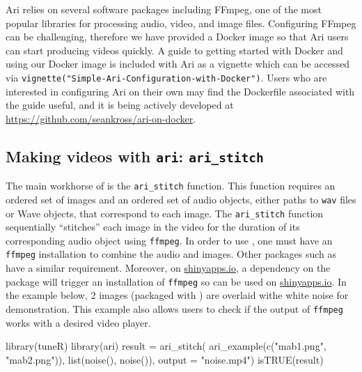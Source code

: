 Ari relies on several software packages including FFmpeg, one of the
most popular libraries for processing audio, video, and image files.
Configuring FFmpeg can be challenging, therefore we have provided a
Docker image so that Ari users can start producing videos quickly. A
guide to getting started with Docker and using our Docker image is
included with Ari as a vignette which can be accessed via
\texttt{vignette("Simple-Ari-Configuration-with-Docker")}. Users who are
interested in configuring Ari on their own may find the Dockerfile
associated with the guide useful, and it is being actively developed at
\url{https://github.com/seankross/ari-on-docker}.

\hypertarget{making-videos-with-ari-ari_stitch}{%
\subsection{\texorpdfstring{Making videos with \texttt{ari}:
\texttt{ari\_stitch}}{Making videos with ari: ari\_stitch}}\label{making-videos-with-ari-ari_stitch}}

The main workhorse of  is the \texttt{ari\_stitch} function.
This function requires an ordered set of images and an ordered set of
audio objects, either paths to \texttt{wav} files or  Wave
objects, that correspond to each image. The \texttt{ari\_stitch}
function sequentially ``stitches'' each image in the video for the
duration of its corresponding audio object using \texttt{ffmpeg}. In
order to use , one must have an \texttt{ffmpeg} installation to
combine the audio and images. Other packages such as 
have a similar requirement. Moreover, on
\href{https://www.shinyapps.io/}{shinyapps.io}, a dependency on the
 package will trigger an installation of \texttt{ffmpeg}
so  can be used on
\href{https://www.shinyapps.io/}{shinyapps.io}. In the example below, 2
images (packaged with ) are overlaid withe white noise for
demonstration. This example also allows users to check if the output of
\texttt{ffmpeg} works with a desired video player.

\begin{Schunk}
\begin{Sinput}
library(tuneR)
library(ari)
result = ari_stitch(
  ari_example(c("mab1.png", "mab2.png")),
  list(noise(), noise()),
  output = "noise.mp4")
isTRUE(result)
\end{Sinput}
\end{Schunk}

